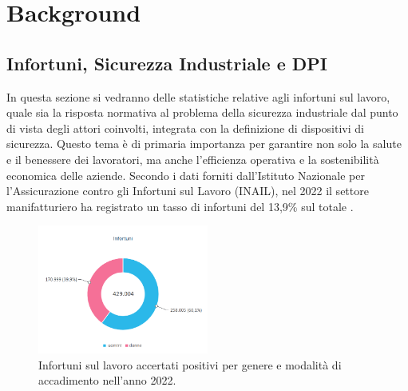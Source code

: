 \chapter{Background}

\section{Infortuni, Sicurezza Industriale e DPI}


In questa sezione si vedranno delle statistiche relative agli infortuni sul lavoro, quale sia la risposta normativa al problema della sicurezza industriale dal punto di vista degli attori coinvolti, integrata con la definizione di dispositivi di sicurezza. Questo tema è di primaria importanza per garantire non solo la salute e il benessere dei lavoratori, ma anche l'efficienza operativa e la sostenibilità economica delle aziende. Secondo i dati forniti dall'Istituto Nazionale per l'Assicurazione contro gli Infortuni sul Lavoro (INAIL), nel 2022 il settore manifatturiero ha registrato un tasso di infortuni del 13,9\% sul totale \cite{a1inail2023}.

\begin{figure}[htbp]
    \centering
    \includegraphics[width=0.5\textwidth]{figures/totaleinfortuni.png}
    \caption{Infortuni sul lavoro accertati positivi per genere
e modalità di accadimento nell'anno 2022.}
    \label{fig:infortot}
\end{figure}

